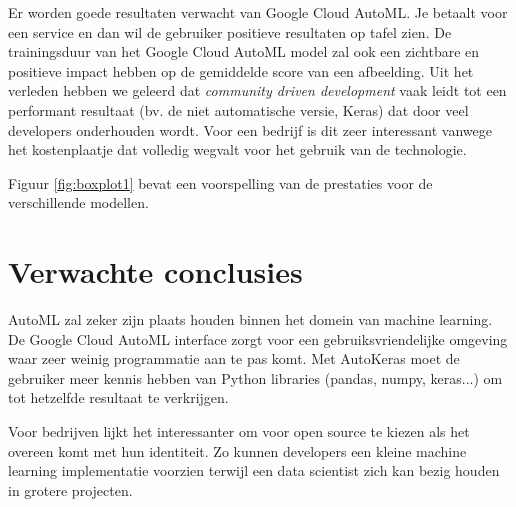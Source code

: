 Er worden goede resultaten verwacht van Google Cloud AutoML. Je betaalt voor een service en dan wil de gebruiker positieve resultaten op tafel zien. De trainingsduur van het Google Cloud AutoML model zal ook een zichtbare en positieve impact hebben op de gemiddelde score van een afbeelding. Uit het verleden hebben we geleerd dat \emph{community driven development} vaak leidt tot een performant resultaat (bv. de niet automatische versie, Keras) dat door veel developers onderhouden wordt. Voor een bedrijf is dit zeer interessant vanwege het kostenplaatje dat volledig wegvalt voor het gebruik van de technologie. 

Figuur \ref{fig:boxplot1} bevat een voorspelling van de prestaties voor de verschillende modellen.

\section{Verwachte conclusies}
\label{sec:verwachte_conclusies}

AutoML zal zeker zijn plaats houden binnen het domein van machine learning. De Google Cloud AutoML interface zorgt voor een gebruiksvriendelijke omgeving waar zeer weinig programmatie aan te pas komt. Met AutoKeras moet de gebruiker meer kennis hebben van Python libraries (pandas, numpy, keras...) om tot hetzelfde resultaat te verkrijgen. 

Voor bedrijven lijkt het interessanter om voor open source te kiezen als het overeen komt met hun identiteit. Zo kunnen developers een kleine machine learning implementatie voorzien terwijl een data scientist zich kan bezig houden in grotere projecten.

